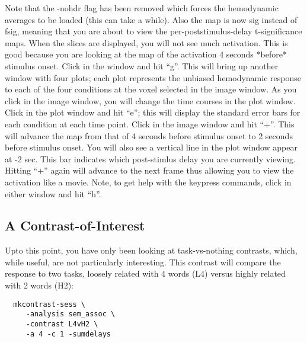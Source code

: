 \documentclass[12pt]{article}
\begin{document}
Note that the -nohdr flag has been removed which forces the
hemodynamic averages to be loaded (this can take a while). Also the
map is now sig instead of fsig, meaning that you are about to view the
per-poststimulus-delay t-significance maps. When the slices are
displayed, you will not see much activation. This is good because you
are looking at the map of the activation 4 seconds *before* stimulus
onset. Click in the window and hit ``g''. This will bring up another
window with four plots; each plot represents the unbiased hemodynamic
response to each of the four conditions at the voxel selected in the
image window. As you click in the image window, you will change the
time courses in the plot window. Click in the plot window and hit
``e''; this will display the standard error bars for each condition at
each time point.  Click in the image window and hit ``+''. This will
advance the map from that of 4 seconds before stimulus onset to 2
seconds before stimulus onset.  You will also see a vertical line in
the plot window appear at -2 sec. This bar indicates which
post-stimlus delay you are currently viewing. Hitting ``+'' again will
advance to the next frame thus allowing you to view the activation
like a movie. Note, to get help with the keypress commands, click in
either window and hit ``h''.

\subsection{A Contrast-of-Interest}

Upto this point, you have only been looking at task-vs-nothing
contrasts, which, while useful, are not particularly interesting. This
contrast will compare the response to two tasks, loosely related with
4 words (L4) versus highly related with 2 words (H2):

\begin{verbatim}
  mkcontrast-sess \
     -analysis sem_assoc \
     -contrast L4vH2 \
     -a 4 -c 1 -sumdelays
\end{verbatim}
\end{document}
